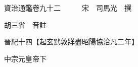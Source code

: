 










 


 
 


 

  
  
  
  
  





  
  
  
  
  
 
  

  

  
  
  



  

 
 

  
   




  

  
  


  　　資治通鑑卷九十二　　　宋　司馬光　撰

　　胡三省　音註

　　晉紀十四【起玄黓敦牂盡昭陽協洽凡二年】

　　中宗元皇帝下

